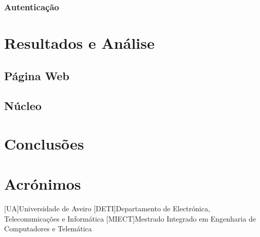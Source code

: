 \documentclass{report}
\begin{document}
\subsection{Autenticação}

\chapter{Resultados e Análise}
\label{chap.res}

\section{Página Web}

\section{Núcleo}


\chapter{Conclusões}
\label{chap.conc}



\chapter*{Acrónimos}
\begin{acronym}
 [UA]{Universidade de Aveiro}
 [DETI]{Departamento de Electrónica, Telecomunicações e Informática}
 [MIECT]{Mestrado Integrado em Engenharia de Computadores e Telemática}

\end{acronym}


%
\end{document}
